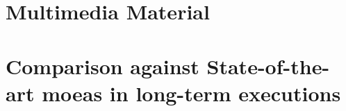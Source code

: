 \documentclass[twoside]{article}
\newcommand{\MOEAS}{{\sc moea}s}
\begin{document}
\section{Multimedia Material}


\section{Comparison against State-of-the-art \MOEAS{} in long-term executions}




\small



\end{document}
